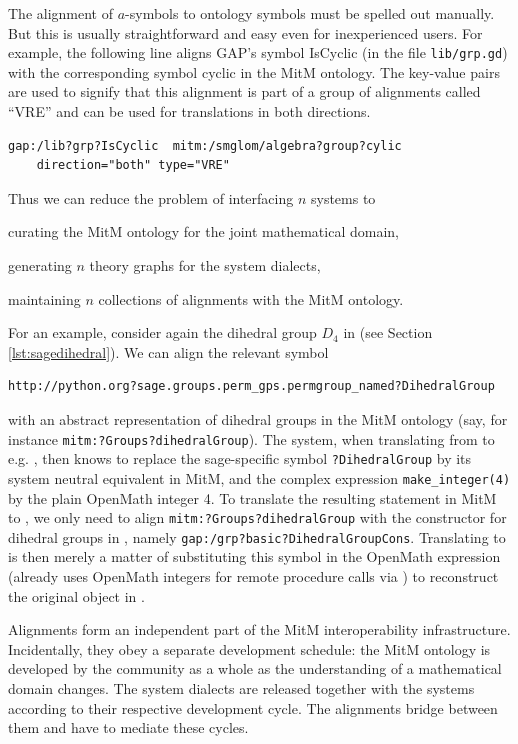 The alignment of $a$-symbols to ontology symbols must be spelled out manually.
But this is usually straightforward and easy even for inexperienced users. For example, the following line aligns GAP's symbol \textsf{IsCyclic} (in the file \lstinline|lib/grp.gd|) with the corresponding symbol \textsf{cyclic} in the MitM ontology.
The key-value pairs are used to signify that this alignment is part of a group of alignments called ``VRE'' and can be used for translations in both directions.

\begin{lstlisting}
gap:/lib?grp?IsCyclic  mitm:/smglom/algebra?group?cylic
    direction="both" type="VRE"
\end{lstlisting}

Thus we can reduce the problem of interfacing $n$ systems to
\begin{inparaenum}[\em i\rm)]
\item curating the MitM ontology for the joint mathematical domain,
\item generating $n$ theory graphs for the system dialects,
\item maintaining $n$ collections of alignments with the MitM ontology.
\end{inparaenum}\medskip

For an example, consider again the dihedral group $D_4$ in \Sage (see Section \ref{lst:sagedihedral}). We can align the relevant symbol 
\begin{lstlisting}
http://python.org?sage.groups.perm_gps.permgroup_named?DihedralGroup
\end{lstlisting}
with an abstract representation of dihedral groups in the MitM ontology (say, for instance \lstinline|mitm:?Groups?dihedralGroup|).
The \MMT system, when translating from \Sage to e.g. \GAP, then knows to replace the sage-specific symbol \lstinline|?DihedralGroup| by its system neutral equivalent in MitM, and the complex expression \lstinline+make_integer(4)+ by the plain OpenMath integer 4. To translate the resulting statement in MitM to \GAP, we only need to align \lstinline+mitm:?Groups?dihedralGroup+ with the constructor for dihedral groups in \GAP, namely \lstinline+gap:/grp?basic?DihedralGroupCons+. Translating to \GAP is then merely a matter of substituting this symbol in the OpenMath expression (\GAP already uses OpenMath integers for remote procedure calls via \SCSCP) to reconstruct the original \Sage object in \GAP.
\medskip

Alignments form an independent part of the MitM interoperability infrastructure.
Incidentally, they obey a separate development schedule: the MitM ontology is developed by the community as a whole as the understanding of a mathematical domain changes.
The system dialects are released together with the systems according to their respective development cycle.
The alignments bridge between them and have to mediate these cycles.

